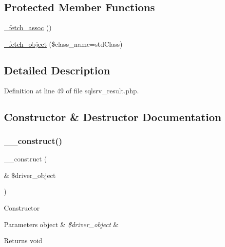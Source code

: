 \subsection*{Protected Member Functions}
\begin{DoxyCompactItemize}
\item 
\mbox{\hyperlink{class_c_i___d_b__sqlsrv__result_a43a9a92817f1334a1c10752ec44275a0}{\+\_\+fetch\+\_\+assoc}} ()
\item 
\mbox{\hyperlink{class_c_i___d_b__sqlsrv__result_a60806be6a9c2488820813c2a7f4fef71}{\+\_\+fetch\+\_\+object}} (\$class\+\_\+name=\textquotesingle{}std\+Class\textquotesingle{})
\end{DoxyCompactItemize}


\subsection{Detailed Description}


Definition at line 49 of file sqlsrv\+\_\+result.\+php.



\subsection{Constructor \& Destructor Documentation}
\mbox{\label{class_c_i___d_b__sqlsrv__result_a8e093c8b6e5733bc3f306385ee426ab7}} 
\subsubsection{\texorpdfstring{\_\_construct()}{\_\_construct()}}
{\footnotesize\ttfamily \+\_\+\+\_\+construct (\begin{DoxyParamCaption}\item[{\&}]{\$driver\+\_\+object }\end{DoxyParamCaption})}

Constructor


\begin{DoxyParams}[1]{Parameters}
object & {\em \$driver\+\_\+object} & \\
\hline
\end{DoxyParams}
\begin{DoxyReturn}{Returns}
void 
\end{DoxyReturn}


